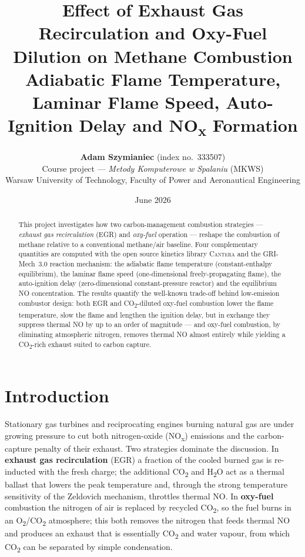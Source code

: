 \documentclass[11pt,a4paper]{article}
\title{\vspace{-1.0cm}\textbf{Effect of Exhaust Gas Recirculation and Oxy-Fuel
Dilution on Methane Combustion}\\[0.3cm]
\large Adiabatic Flame Temperature, Laminar Flame Speed, Auto-Ignition Delay
and NO\textsubscript{x} Formation}
\author{\textbf{Adam Szymianiec} \quad (index no.\ 333507)\\[0.25cm]
Course project --- \emph{Metody Komputerowe w Spalaniu} (MKWS)\\
Warsaw University of Technology, Faculty of Power and Aeronautical Engineering}
\date{June 2026}
\begin{document}
\maketitle
\thispagestyle{fancy}

\begin{abstract}
\noindent This project investigates how two carbon-management combustion
strategies --- \emph{exhaust gas recirculation} (EGR) and \emph{oxy-fuel}
operation --- reshape the combustion of methane relative to a conventional
methane/air baseline. Four complementary quantities are computed with the open
source kinetics library \textsc{Cantera} and the GRI-Mech~3.0 reaction
mechanism: the adiabatic flame temperature (constant-enthalpy equilibrium), the
laminar flame speed (one-dimensional freely-propagating flame), the
auto-ignition delay (zero-dimensional constant-pressure reactor) and the
equilibrium NO concentration. The results quantify the well-known trade-off
behind low-emission combustor design: both EGR and CO\textsubscript{2}-diluted
oxy-fuel combustion lower the flame temperature, slow the flame and lengthen the
ignition delay, but in exchange they suppress thermal NO by up to an order of
magnitude --- and oxy-fuel combustion, by eliminating atmospheric nitrogen,
removes thermal NO almost entirely while yielding a CO\textsubscript{2}-rich
exhaust suited to carbon capture.
\end{abstract}

\section{Introduction}
Stationary gas turbines and reciprocating engines burning natural gas are under
growing pressure to cut both nitrogen-oxide (NO\textsubscript{x}) emissions and
the carbon-capture penalty of their exhaust. Two strategies dominate the
discussion. In \textbf{exhaust gas recirculation} (EGR) a fraction of the cooled
burned gas is re-inducted with the fresh charge; the additional
CO\textsubscript{2} and H\textsubscript{2}O act as a thermal ballast that lowers
the peak temperature and, through the strong temperature sensitivity of the
Zeldovich mechanism, throttles thermal NO. In \textbf{oxy-fuel} combustion the
nitrogen of air is replaced by recycled CO\textsubscript{2}, so the fuel burns
in an O\textsubscript{2}/CO\textsubscript{2} atmosphere; this both removes the
nitrogen that feeds thermal NO and produces an exhaust that is essentially
CO\textsubscript{2} and water vapour, from which CO\textsubscript{2} can be
separated by simple condensation.
\end{document}
